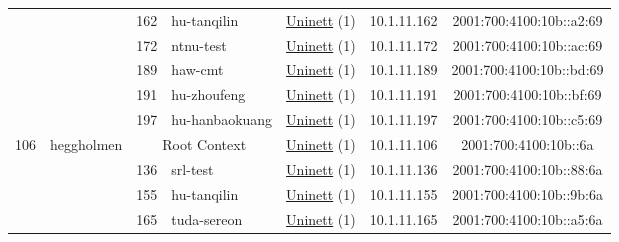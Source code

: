 \begin{small}
\begin{center}
\begin{longtable}{|c|c|c|c|c|c|c|c|}
  &  & \tiny{162} & \multicolumn{1}{|l|}{\tiny{hu-tanqilin}} & \multicolumn{2}{|c|}{\tiny{\href{https://www.uninett.no}{Uninett} (1)}} & \tiny{10.1.11.162} & \tiny{2001:700:4100:10b::a2:69} \\* \cline{3-3}\cline{4-4}\cline{5-5}\cline{6-6}\cline{7-7}\cline{8-8}
  &  & \tiny{172} & \multicolumn{1}{|l|}{\tiny{ntnu-test}} & \multicolumn{2}{|c|}{\tiny{\href{https://www.uninett.no}{Uninett} (1)}} & \tiny{10.1.11.172} & \tiny{2001:700:4100:10b::ac:69} \\* \cline{3-3}\cline{4-4}\cline{5-5}\cline{6-6}\cline{7-7}\cline{8-8}
  &  & \tiny{189} & \multicolumn{1}{|l|}{\tiny{haw-cmt}} & \multicolumn{2}{|c|}{\tiny{\href{https://www.uninett.no}{Uninett} (1)}} & \tiny{10.1.11.189} & \tiny{2001:700:4100:10b::bd:69} \\* \cline{3-3}\cline{4-4}\cline{5-5}\cline{6-6}\cline{7-7}\cline{8-8}
  &  & \tiny{191} & \multicolumn{1}{|l|}{\tiny{hu-zhoufeng}} & \multicolumn{2}{|c|}{\tiny{\href{https://www.uninett.no}{Uninett} (1)}} & \tiny{10.1.11.191} & \tiny{2001:700:4100:10b::bf:69} \\* \cline{3-3}\cline{4-4}\cline{5-5}\cline{6-6}\cline{7-7}\cline{8-8}
  &  & \tiny{197} & \multicolumn{1}{|l|}{\tiny{hu-hanbaokuang}} & \multicolumn{2}{|c|}{\tiny{\href{https://www.uninett.no}{Uninett} (1)}} & \tiny{10.1.11.197} & \tiny{2001:700:4100:10b::c5:69} \\ \hline
 \multirow{7}{*}{\tiny{106}} & \multicolumn{1}{|l|}{\multirow{7}{*}{\tiny{heggholmen}}} & \multicolumn{2}{|c|}{\tiny{Root Context}} & \multicolumn{2}{|c|}{\tiny{\href{https://www.uninett.no}{Uninett} (1)}} & \tiny{10.1.11.106} & \tiny{2001:700:4100:10b::6a} \\* \cline{3-3}\cline{4-4}\cline{5-5}\cline{6-6}\cline{7-7}\cline{8-8}
  &  & \tiny{136} & \multicolumn{1}{|l|}{\tiny{srl-test}} & \multicolumn{2}{|c|}{\tiny{\href{https://www.uninett.no}{Uninett} (1)}} & \tiny{10.1.11.136} & \tiny{2001:700:4100:10b::88:6a} \\* \cline{3-3}\cline{4-4}\cline{5-5}\cline{6-6}\cline{7-7}\cline{8-8}
  &  & \tiny{155} & \multicolumn{1}{|l|}{\tiny{hu-tanqilin}} & \multicolumn{2}{|c|}{\tiny{\href{https://www.uninett.no}{Uninett} (1)}} & \tiny{10.1.11.155} & \tiny{2001:700:4100:10b::9b:6a} \\* \cline{3-3}\cline{4-4}\cline{5-5}\cline{6-6}\cline{7-7}\cline{8-8}
  &  & \tiny{165} & \multicolumn{1}{|l|}{\tiny{tuda-sereon}} & \multicolumn{2}{|c|}{\tiny{\href{https://www.uninett.no}{Uninett} (1)}} & \tiny{10.1.11.165} & \tiny{2001:700:4100:10b::a5:6a} \\* \cline{3-3}\cline{4-4}\cline{5-5}\cline{6-6}\cline{7-7}\cline{8-8}

\end{longtable}
\end{center}
\end{small}
